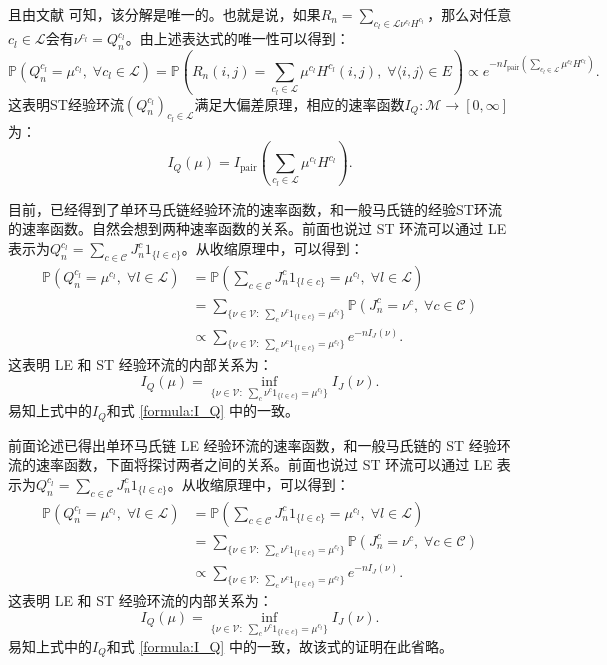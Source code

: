 且由文献 \cite{kalpazidou2007cycle}可知，该分解是唯一的。也就是说，如果$R_n =\sum_{c_l \in \mathcal{L}\nu^{c_l}H^{c_l}}$，那么对任意$c_l \in \mathcal{L}$会有$\nu^{c_l}=Q_n^{c_l}$。由上述表达式的唯一性可以得到：
\begin{equation*}
    \mathbb{P}(Q_n^{c_l}=\mu^{c_l},\;\forall c_l\in\mathcal{L})
    =\mathbb{P}\left(R_n(i,j)=\sum_{c_l\in\mathcal{L}}\mu^{c_l}H^{c_l}(i,j),\;\forall\langle i,j\rangle\in E\right)
    \propto e^{-n I_{\mathrm{pair}}\left(\sum_{c_l\in\mathcal{L}}\mu^{c_l}H^{c_l}\right)}.
\end{equation*}
这表明ST经验环流$(Q_n^{c_l})_{c_l\in\mathcal{L}}$满足大偏差原理，相应的速率函数$I_Q:\mathcal{M}\rightarrow[0,\infty]$为：
\begin{equation}\label{formula:I_Q}
I_Q(\mu)=I_{\mathrm{pair}}\left(\sum_{c_l\in\mathcal{L}}\mu^{c_l}H^{c_l}\right).
\end{equation}

目前，已经得到了单环马氏链经验环流的速率函数，和一般马氏链的经验ST环流的速率函数。自然会想到两种速率函数的关系。前面也说过 ST 环流可以通过 LE 表示为$Q_n^{c_l} = \sum_{c\in\mathcal{C}}J^c_n1_{\{l\in c\}}$。从收缩原理中，可以得到：
\begin{align*}
	\mathbb{P}\left(Q_n^{c_l}=\mu^{c_l},\;\forall l\in\mathcal{L}\right)
	&= \mathbb{P}\left(\sum_{c\in\mathcal{C}}J^c_n1_{\{l\in c\}}=\mu^{c_l},\;\forall l\in\mathcal{L}\right)\\
	&= \sum_{\{\nu\in\mathcal{V}:\;\sum_c\nu^c1_{\{l\in c\}}=\mu^{c_l}\}}
	\mathbb{P}\left(J^c_n=\nu^c,\;\forall c\in\mathcal{C}\right)\\
	&\propto \sum_{\{\nu\in\mathcal{V}:\;\sum_c\nu^c1_{\{l\in c\}}=\mu^{c_l}\}}e^{-nI_J(\nu)}.
\end{align*}
这表明 LE 和 ST 经验环流的内部关系为：
\begin{equation*}
	I_Q(\mu) = \inf_{\{\nu\in\mathcal{V}:\;\sum_c\nu^c1_{\{l\in c\}}=\mu^{c_l}\}}I_J(\nu).
\end{equation*}
易知上式中的$I_Q$和式 \eqref{formula:I_Q} 中的一致。

前面论述已得出单环马氏链 LE 经验环流的速率函数，和一般马氏链的 ST 经验环流的速率函数，下面将探讨两者之间的关系。前面也说过 ST 环流可以通过 LE 表示为$Q_n^{c_l} = \sum_{c\in\mathcal{C}}J^c_n1_{\{l\in c\}}$。从收缩原理中，可以得到：
\begin{align*}
	\mathbb{P}\left(Q_n^{c_l}=\mu^{c_l},\;\forall l\in\mathcal{L}\right)
	&= \mathbb{P}\left(\sum_{c\in\mathcal{C}}J^c_n1_{\{l\in c\}}=\mu^{c_l},\;\forall l\in\mathcal{L}\right)\\
	&= \sum_{\{\nu\in\mathcal{V}:\;\sum_c\nu^c1_{\{l\in c\}}=\mu^{c_l}\}}
	\mathbb{P}\left(J^c_n=\nu^c,\;\forall c\in\mathcal{C}\right)\\
	&\propto \sum_{\{\nu\in\mathcal{V}:\;\sum_c\nu^c1_{\{l\in c\}}=\mu^{c_l}\}}e^{-nI_J(\nu)}.
\end{align*}
这表明 LE 和 ST 经验环流的内部关系为：
\begin{equation*}
	I_Q(\mu) = \inf_{\{\nu\in\mathcal{V}:\;\sum_c\nu^c1_{\{l\in c\}}=\mu^{c_l}\}}I_J(\nu).
\end{equation*}
易知上式中的$I_Q$和式 \eqref{formula:I_Q} 中的一致，故该式的证明在此省略。


